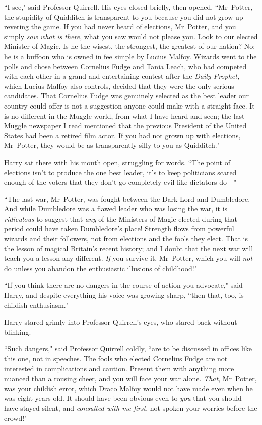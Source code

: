 ``I see," said Professor Quirrell. His eyes closed briefly, then opened. ``Mr~Potter, the stupidity of Quidditch is transparent to you because you did not grow up revering the game. If you had never heard of elections, Mr~Potter, and you simply \emph{saw what is there}, what you saw would not please you. Look to our elected Minister of Magic. Is he the wisest, the strongest, the greatest of our nation? No; he is a buffoon who is owned in fee simple by Lucius Malfoy. Wizards went to the polls and chose between Cornelius Fudge and Tania Leach, who had competed with each other in a grand and entertaining contest after the \emph{Daily Prophet,} which Lucius Malfoy also controls, decided that they were the only serious candidates. That Cornelius Fudge was genuinely selected as the best leader our country could offer is not a suggestion anyone could make with a straight face. It is no different in the Muggle world, from what I have heard and seen; the last Muggle newspaper I read mentioned that the previous President of the United States had been a retired film actor. If you had not grown up with elections, Mr~Potter, they would be as transparently silly to you as Quidditch."

Harry sat there with his mouth open, struggling for words. ``The point of elections isn't to produce the one best leader, it's to keep politicians scared enough of the voters that they don't go completely evil like dictators do—"

``The last war, Mr~Potter, was fought between the Dark Lord and Dumbledore. And while Dumbledore was a flawed leader who was losing the war, it is \emph{ridiculous} to suggest that \emph{any} of the Ministers of Magic elected during that period could have taken Dumbledore's place! Strength flows from powerful wizards and their followers, not from elections and the fools they elect. That is the lesson of magical Britain's recent history; and I doubt that the next war will teach you a lesson any different. \emph{If} you survive it, Mr~Potter, which you will \emph{not} do unless you abandon the enthusiastic illusions of childhood!"

``If you think there are no dangers in the course of action you advocate," said Harry, and despite everything his voice was growing sharp, ``then that, too, is childish enthusiasm."

Harry stared grimly into Professor Quirrell's eyes, who stared back without blinking.

``Such dangers," said Professor Quirrell coldly, ``are to be discussed in offices like this one, not in speeches. The fools who elected Cornelius Fudge are not interested in complications and caution. Present them with anything more nuanced than a rousing cheer, and you will face your war alone. \emph{That}, Mr~Potter, was your childish error, which Draco Malfoy would not have made even when he was eight years old. It should have been obvious even to \emph{you} that you should have stayed silent, and \emph{consulted with me first}, not spoken your worries before the crowd!"


